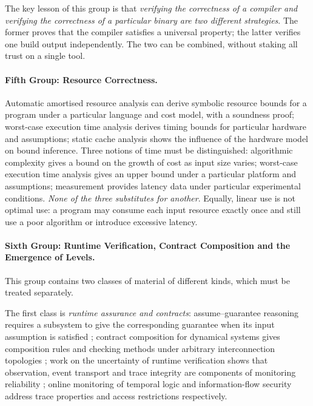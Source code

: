 The key lesson of this group is that \emph{verifying the correctness of a compiler and
verifying the correctness of a particular binary are two different strategies}. The former
proves that the compiler satisfies a universal property; the latter verifies one build
output independently. The two can be combined, without staking all trust on a single tool.

\paragraph{Fifth Group: Resource Correctness.}
Automatic amortised resource analysis can derive symbolic resource bounds for a program
under a particular language and cost model, with a soundness proof; worst-case execution
time analysis derives timing bounds for particular hardware and assumptions; static cache
analysis shows the influence of the hardware model on bound inference. Three notions of
time must be distinguished: algorithmic complexity gives a bound on the growth of cost as
input size varies; worst-case execution time analysis gives an upper bound under a
particular platform and assumptions; measurement provides latency data under particular
experimental conditions. \emph{None of the three substitutes for another}. Equally, linear
use is not optimal use: a program may consume each input resource exactly once and still use
a poor algorithm or introduce excessive latency.

\paragraph{Sixth Group: Runtime Verification, Contract Composition and the Emergence of Levels.}
This group contains two classes of material of different kinds, which must be treated
separately.

The first class is \emph{runtime assurance and contracts}: assume--guarantee reasoning
requires a subsystem to give the corresponding guarantee when its input assumption is
satisfied \cite{henzinger1998}; contract composition for dynamical systems gives composition
rules and checking methods under arbitrary interconnection topologies
\cite{sharf2021,sharf2024,shali2026}; work on the uncertainty of runtime verification shows
that observation, event transport and trace integrity are components of monitoring
reliability \cite{taleb2023}; online monitoring of temporal logic \cite{leucker2009} and
information-flow security \cite{goguen1982} address trace properties and access
restrictions respectively.

